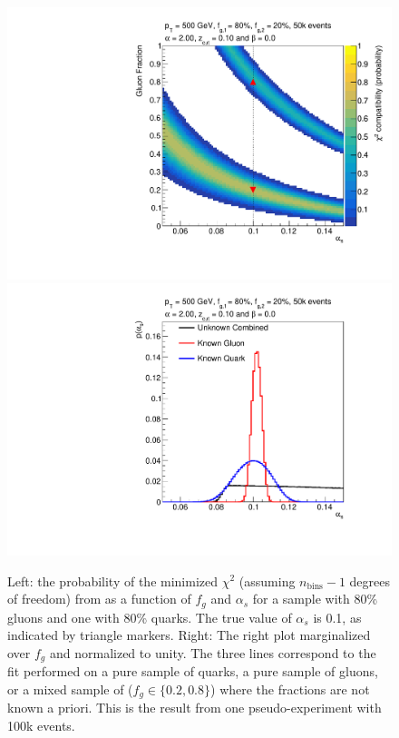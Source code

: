 \begin{figure}[t]
\begin{center}
\includegraphics[width = 0.49\columnwidth]{figures/banana_alpha_20beta_0_zcut_123451324.pdf}\includegraphics[width = 0.49\columnwidth]{figures/palpha_alpha_20beta_0_zcut_123451324.pdf}
\end{center}
\caption{Left: the probability of the minimized $\chi^2$ (assuming $n_\text{bins}-1$ degrees of freedom) from  as a
  function of $f_g$ and $\alpha_s$ for a sample with 80\% gluons and one with 80\% quarks.  The true value of $\alpha_s$ is 0.1, as indicated by triangle markers.  Right: The right plot marginalized over $f_g$ and normalized to unity.  The three lines correspond to the fit performed on a pure sample of quarks, a pure sample of gluons, or a mixed sample of ($f_g\in\{0.2,0.8\}$) where the fractions are not known a priori.  This is the result from one pseudo-experiment with 100k events.}
\label{fig:alpha2fit}
\end{figure}



